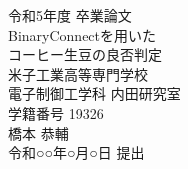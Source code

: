 

\begin{titlepage}
	\begin{center}
		\vspace*{30truept}
		{\Large 令和5年度 卒業論文} \\
		\vspace{100truept}
		{\LARGE BinaryConnectを用いた}\\
		\vspace{12truept}
		{\LARGE コーヒー生豆の良否判定} 
		\vspace{80truept}\\
		{\large
		米子工業高等専門学校\\
		電子制御工学科 内田研究室\\
		}
		\vspace{50truept}
		{\large 学籍番号 19326}\\ %
	
		\vspace{10truept}
		{\large  橋本 恭輔}\\ %
	
		\vspace{50truept}
		{\large 令和○○年○月○日 提出}\\ %
	\end{center}
\end{titlepage}


